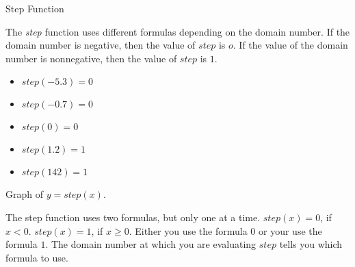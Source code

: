 \documentclass{ximera}
\begin{document}
\begin{example} Step Function


The \textit{step} function uses different formulas depending on the domain number.  If the domain number is negative, then the value of $step$ is $o$. If the value of the domain number is nonnegative, then the value of $step$ is $1$.



\begin{itemize}
\item $step(-5.3) = 0$
\item $step(-0.7) = 0$
\item $step(0) = 0$
\item $step(1.2) = 1$
\item $step(142) = 1$
\end{itemize}



Graph of $y = step(x)$.
\begin{image}
\end{image}


\end{example}





The step function uses two formulas, but only one at a time.  $step(x) = 0$, if $x < 0$. $step(x) = 1$, if $x \geq 0$.  Either you use the formula $0$ or your use the formula $1$.  The domain number at which you are evaluating $step$ tells you which formula to use.
\end{document}
